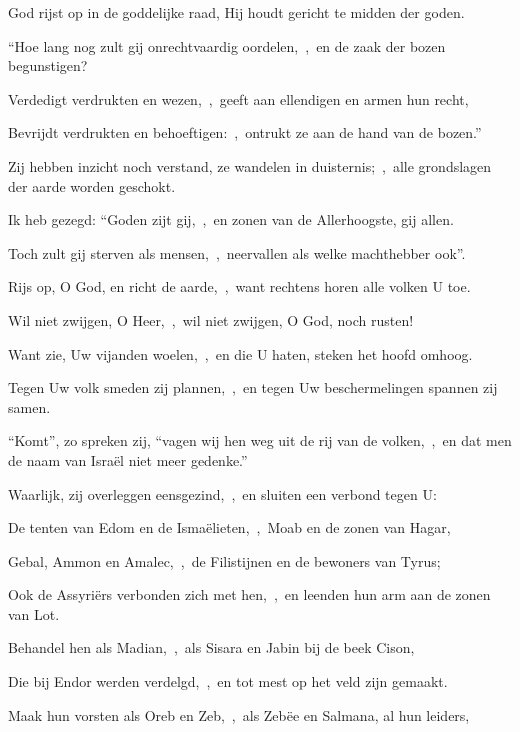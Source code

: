\documentclass[12pt,twoside,a5paper]{article}
\begin{document}
\begin{halfparskip}

   God rijst op in de goddelijke raad, Hij houdt gericht te midden der goden.


  ``Hoe lang nog zult gij onrechtvaardig oordelen,~\sep\ en de zaak der bozen begunstigen?

  Verdedigt verdrukten en wezen,~\sep\ geeft aan ellendigen en armen hun recht,

  Bevrijdt verdrukten en behoeftigen:~\sep\ ontrukt ze aan de hand van de bozen.''

  Zij hebben inzicht noch verstand, ze wandelen in duisternis;~\sep\ alle grondslagen der aarde worden  geschokt.

  Ik heb gezegd: ``Goden zijt gij,~\sep\ en zonen van de Allerhoogste, gij allen.

  Toch zult gij sterven als mensen,~\sep\ neervallen als welke machthebber ook''.

  Rijs op, O God, en richt de aarde,~\sep\ want rechtens horen alle volken U toe.

   Wil niet zwijgen, O Heer,~\sep\ wil niet zwijgen, O God, noch rusten!

  Want zie, Uw vijanden woelen,~\sep\ en die U haten, steken het hoofd omhoog.

  Tegen Uw volk smeden zij plannen,~\sep\ en tegen Uw beschermelingen spannen zij samen.

  ``Komt'', zo spreken zij, ``vagen wij hen weg uit de rij van de volken,~\sep\ en dat men de naam van Israël niet meer gedenke.''

  Waarlijk, zij overleggen eensgezind,~\sep\ en sluiten een verbond tegen U:

  De tenten van Edom en de Ismaëlieten,~\sep\ Moab en de zonen van Hagar,

  Gebal, Ammon en Amalec,~\sep\ de Filistijnen en de bewoners van Tyrus;

  Ook de Assyriërs verbonden zich met hen,~\sep\ en leenden hun arm aan de zonen van Lot.

  Behandel hen als Madian,~\sep\ als Sisara en Jabin bij de beek Cison,

  Die bij Endor werden verdelgd,~\sep\ en tot mest op het veld zijn gemaakt.

  Maak hun vorsten als Oreb en Zeb,~\sep\ als Zebëe en Salmana, al hun leiders,


\end{halfparskip}
\end{document}
